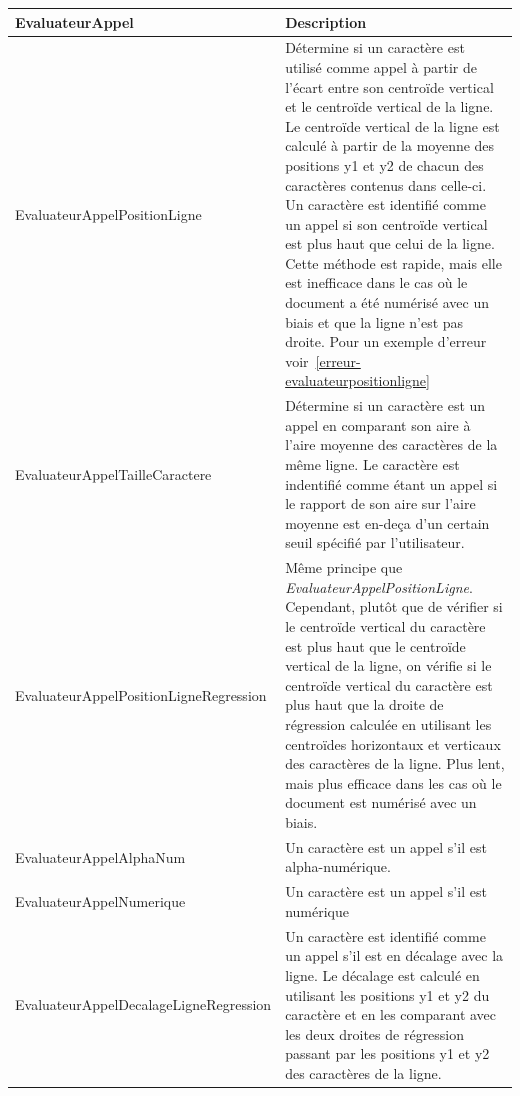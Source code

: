 \begin{table}
\begin{tabular}{| p{4cm} | p{12cm} |}
    \hline
    \rowcolor[gray]{0.9}
    EvaluateurAppel & Description \\
    \hline
    EvaluateurAppelPosition\linebreak Ligne & Détermine si un caractère est utilisé comme appel à partir de l'écart entre son centroïde vertical et le centroïde vertical de la ligne. Le centroïde vertical de la ligne est calculé à partir de la moyenne des positions y1 et y2 de chacun des caractères contenus dans celle-ci. Un caractère est identifié comme un appel si son centroïde vertical est plus haut que celui de la ligne. Cette méthode est rapide, mais elle est inefficace dans le cas où le document a été numérisé avec un biais et que la ligne n'est pas droite. Pour un exemple d'erreur voir~\ref{erreur-evaluateurpositionligne} \\
    \hline
    EvaluateurAppelTaille\linebreak Caractere & Détermine si un caractère est un appel en comparant son aire à l'aire moyenne des caractères de la même ligne. Le caractère est indentifié comme étant un appel si le rapport de son aire sur l'aire moyenne est en-deça d'un certain seuil spécifié par l'utilisateur. \\
    \hline
    EvaluateurAppelPosition\linebreak LigneRegression & Même principe que \emph{EvaluateurAppelPositionLigne}. Cependant, plutôt que de vérifier si le centroïde vertical du caractère est plus haut que le centroïde vertical de la ligne, on vérifie si le centroïde vertical du caractère est plus haut que la droite de régression calculée en utilisant les centroïdes horizontaux et verticaux des caractères de la ligne. Plus lent, mais plus efficace dans les cas où le document est numérisé avec un biais. \\
    \hline
    EvaluateurAppelAlphaNum & Un caractère est un appel s'il est alpha-numérique. \\
    \hline
    EvaluateurAppel\linebreak Numerique & Un caractère est un appel s'il est numérique \\
    \hline
    EvaluateurAppelDecalage\linebreak LigneRegression & Un caractère est identifié comme un appel s'il est en décalage avec la ligne. Le décalage est calculé en utilisant les positions y1 et y2 du caractère et en les comparant avec les deux droites de régression passant par les positions y1 et y2 des caractères de la ligne. \\

\end{tabular}
\end{table}
